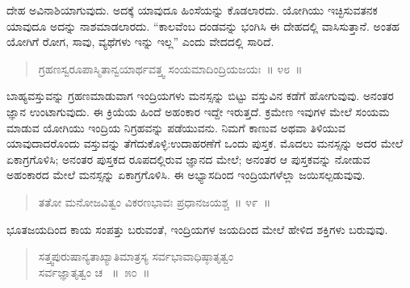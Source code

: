 ದೇಹ ಅವಿನಾಶಿಯಾಗುವುದು. ಅದಕ್ಕೆ ಯಾವುದೂ ಹಿಂಸೆಯನ್ನು ಕೊಡಲಾರದು. ಯೋಗಿಯು ಇಚ್ಛಿಸುವತನಕ ಯಾವುದೂ ಅದನ್ನು ನಾಶಮಾಡಲಾರದು. “ಕಾಲವೆಂಬ ದಂಡವನ್ನು ಭಂಗಿಸಿ ಈ ದೇಹದಲ್ಲಿ ವಾಸಿಸುತ್ತಾನೆ. ಅಂತಹ ಯೋಗಿಗೆ ರೋಗ, ಸಾವು, ವ್ಯಥೆಗಳು ಇನ್ನು ಇಲ್ಲ” ಎಂದು ವೇದದಲ್ಲಿ ಸಾರಿದೆ. 

\vspace{-0.2cm}

\begin{verse}
ಗ್ರಹಣಸ್ವರೂಪಾಸ್ಮಿತಾನ್ವಯಾರ್ಥವತ್ತ್ವ ಸಂಯಮಾದಿಂದ್ರಿಯಜಯಃ~॥ ೪೮~॥
\end{verse}

\vspace{-0.4cm}


\vspace{0.1cm}

ಬಾಹ್ಯವಸ್ತುವನ್ನು ಗ್ರಹಣಮಾಡುವಾಗ ಇಂದ್ರಿಯಗಳು ಮನಸ್ಸನ್ನು ಬಿಟ್ಟು ವಸ್ತುವಿನ ಕಡೆಗೆ ಹೋಗುವುವು. ಅನಂತರ ಜ್ಞಾನ ಉಂಟಾಗುವುದು. ಈ ಕ್ರಿಯೆಯ ಹಿಂದೆ ಅಹಂಕಾರ ಇದ್ದೇ ಇರುತ್ತದೆ. ಕ್ರಮೇಣ ಇವುಗಳ ಮೇಲೆ ಸಂಯಮ ಮಾಡುವ ಯೋಗಿಯು ಇಂದ್ರಿಯ ನಿಗ್ರಹವನ್ನು ಪಡೆಯುವನು. ನಿಮಗೆ ಕಾಣುವ ಅಥವಾ ತಿಳಿಯುವ ಯಾವುದಾದರೊಂದು ವಸ್ತುವನ್ನು ತೆಗೆದುಕೊಳ್ಳಿ:ಉದಾಹರಣೆಗೆ ಒಂದು ಪುಸ್ತಕ. ಮೊದಲು ಮನಸ್ಸನ್ನು ಅದರ ಮೇಲೆ ಏಕಾಗ್ರಗೊಳಿಸಿ; ಅನಂತರ ಪುಸ್ತಕದ ರೂಪದಲ್ಲಿರುವ ಜ್ಞಾನದ ಮೇಲೆ; ಅನಂತರ ಆ ಪುಸ್ತಕವನ್ನು ನೋಡುವ ಅಹಂಕಾರದ ಮೇಲೆ ಮನಸ್ಸನ್ನು ಏಕಾಗ್ರಗೊಳಿಸಿ. ಈ ಅಭ್ಯಾಸದಿಂದ ಇಂದ್ರಿಯಗಳೆಲ್ಲಾ ಜಯಿಸಲ್ಪಡುವುವು. 

\vspace{-0.2cm}

\begin{verse}
ತತೋ ಮನೋಜವಿತ್ವಂ ವಿಕರಣಭಾವಃ ಪ್ರಧಾನಜಯಶ್ಚ~॥ ೪೯~॥
\end{verse}

\vspace{-0.4cm}


\vspace{0.1cm}

ಭೂತಜಯದಿಂದ ಕಾಯ ಸಂಪತ್ತು ಬರುವಂತೆ, ಇಂದ್ರಿಯಗಳ ಜಯದಿಂದ ಮೇಲೆ ಹೇಳಿದ ಶಕ್ತಿಗಳು ಬರುವುವು. 

\vspace{-0.3cm}

\begin{verse}
ಸತ್ತ್ವಪುರುಷಾನ್ಯತಾಖ್ಯಾತಿಮಾತ್ರಸ್ಯ ಸರ್ವಭಾವಾಧಿಷ್ಠಾತೃತ್ವಂ\\ ಸರ್ವಜ್ಞಾತೃತ್ವಂ ಚ~ \hfill{॥~೫೦~॥}
\end{verse}

